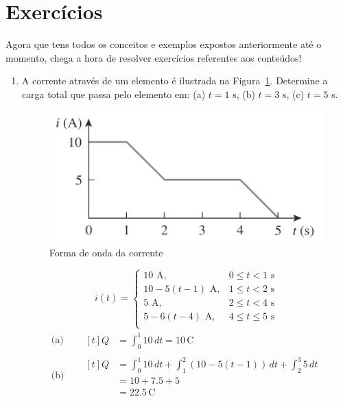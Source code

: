 \section{Exercícios}

Agora que tens todos os conceitos e exemplos expostos anteriormente até o
momento, chega a hora de resolver exercícios referentes aos conteúdos!

\begin{enumerate}
	\item A corrente através de um elemento é ilustrada na Figura~\ref{fig:fig5}.
	      Determine a carga total que passa pelo elemento em: (a) \( t = 1 \) s,
	      (b) \( t = 3 \) s, (c) \( t = 5 \) s.

	      \begin{figure}[H]
		      \centering
		      \includegraphics[height=0.15\textwidth]{./fig/fig5.png}
		      \caption{Forma de onda da corrente}
		      \label{fig:fig5}
	      \end{figure}
	      \[
		      i(t) =
		      \begin{cases}
			      10 \text{ A},            & 0 \leq t < 1 \text{ s}    \\
			      10 - 5(t - 1) \text{ A}, & 1 \leq t < 2 \text{ s}    \\
			      5 \text{ A},             & 2 \leq t < 4 \text{ s}    \\
			      5 - 6(t - 4) \text{ A},  & 4 \leq t \leq 5 \text{ s} \\
		      \end{cases}
	      \]
	      \begin{align*}
		      \text{(a)}\quad &
		      \begin{aligned}[t]
			      Q & = \int_{0}^{1} 10 \,dt = 10 \,\text{C}
		      \end{aligned}
		      \\
		      \text{(b)}\quad &
		      \begin{aligned}[t]
			      Q & = \int_{0}^{1} 10 \,dt + \int_{1}^{2} (10 - 5(t-1)) \,dt + \int_{2}^{3} 5 \,dt \\
			        & = 10 + 7.5 + 5                                                                 \\
			        & = 22.5 \,\text{C}
		      \end{aligned}

\end{align*}
\end{enumerate}

